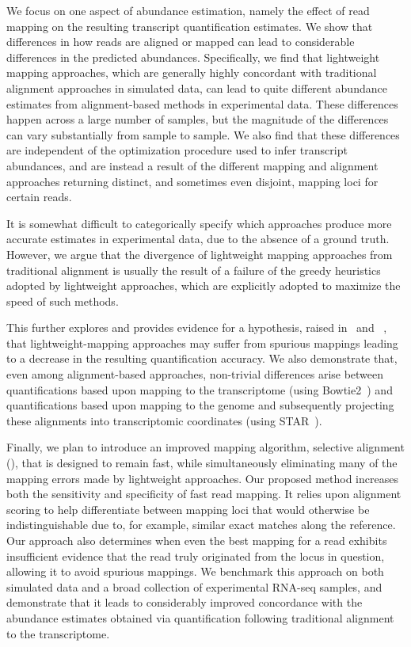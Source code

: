 We focus on one aspect of abundance estimation, namely the
effect of read mapping on the resulting transcript quantification estimates. We
show that differences in how reads are aligned or mapped can lead to
considerable differences in the predicted abundances. Specifically, we find that
lightweight mapping approaches\citep{sailfish,kallisto,rapmap,fleximer}, which
are generally highly concordant with traditional alignment approaches in
simulated data, can lead to quite different abundance estimates from
alignment-based methods in experimental data. These differences happen
across a large number of samples, but the magnitude of the differences can vary 
substantially from sample to sample. 
We also find that these differences are independent of the optimization procedure used to
infer transcript abundances, and are instead a result of the different mapping and
alignment approaches returning distinct, and sometimes even disjoint, mapping loci
for certain reads.

It is somewhat difficult to categorically specify which approaches produce more accurate 
estimates in experimental data, due to the absence of a ground truth. However,
we argue that the divergence of lightweight mapping approaches from traditional
alignment is usually the result of a failure of the greedy heuristics adopted by
lightweight approaches, which are explicitly adopted to maximize the speed of
such methods.

This further explores and provides evidence for a hypothesis, raised
in~\citet{selaln} and ~\citet{heraem}, that lightweight-mapping approaches may suffer from
spurious mappings leading to a decrease in the resulting quantification
accuracy. We also demonstrate that, even among alignment-based approaches,
non-trivial differences arise between quantifications based upon mapping to the
transcriptome (using Bowtie2~\citep{bowtie2}) and quantifications based upon
mapping to the genome and subsequently projecting these alignments into
transcriptomic coordinates (using STAR~\citep{star}).

Finally, we plan to introduce an improved mapping algorithm, selective alignment (\hsa),
that is designed to remain fast, while simultaneously eliminating many of the
mapping errors made by lightweight approaches. Our proposed method increases
both the sensitivity and specificity of fast read mapping. It relies upon
alignment scoring to help differentiate between mapping loci that would
otherwise be indistinguishable due to, for example, similar exact matches along
the reference. Our approach also determines when even the best mapping for a
read exhibits insufficient evidence that the read truly originated from the
locus in question, allowing it to avoid spurious mappings. We benchmark this
approach on both simulated data and a broad collection of experimental
RNA-seq samples, and demonstrate that it leads to considerably improved
concordance with the abundance estimates obtained via quantification following
traditional alignment to the transcriptome.

